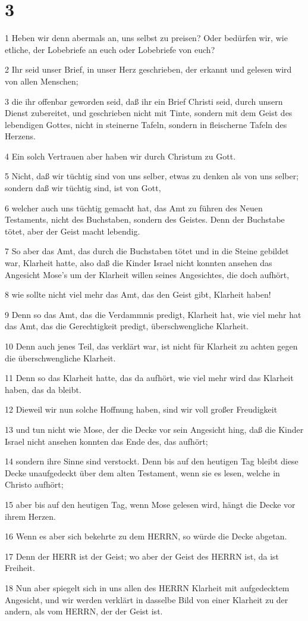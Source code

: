 \chapter{3}

\par 1 Heben wir denn abermals an, uns selbst zu preisen? Oder bedürfen wir, wie etliche, der Lobebriefe an euch oder Lobebriefe von euch?
\par 2 Ihr seid unser Brief, in unser Herz geschrieben, der erkannt und gelesen wird von allen Menschen;
\par 3 die ihr offenbar geworden seid, daß ihr ein Brief Christi seid, durch unsern Dienst zubereitet, und geschrieben nicht mit Tinte, sondern mit dem Geist des lebendigen Gottes, nicht in steinerne Tafeln, sondern in fleischerne Tafeln des Herzens.
\par 4 Ein solch Vertrauen aber haben wir durch Christum zu Gott.
\par 5 Nicht, daß wir tüchtig sind von uns selber, etwas zu denken als von uns selber; sondern daß wir tüchtig sind, ist von Gott,
\par 6 welcher auch uns tüchtig gemacht hat, das Amt zu führen des Neuen Testaments, nicht des Buchstaben, sondern des Geistes. Denn der Buchstabe tötet, aber der Geist macht lebendig.
\par 7 So aber das Amt, das durch die Buchstaben tötet und in die Steine gebildet war, Klarheit hatte, also daß die Kinder Israel nicht konnten ansehen das Angesicht Mose's um der Klarheit willen seines Angesichtes, die doch aufhört,
\par 8 wie sollte nicht viel mehr das Amt, das den Geist gibt, Klarheit haben!
\par 9 Denn so das Amt, das die Verdammnis predigt, Klarheit hat, wie viel mehr hat das Amt, das die Gerechtigkeit predigt, überschwengliche Klarheit.
\par 10 Denn auch jenes Teil, das verklärt war, ist nicht für Klarheit zu achten gegen die überschwengliche Klarheit.
\par 11 Denn so das Klarheit hatte, das da aufhört, wie viel mehr wird das Klarheit haben, das da bleibt.
\par 12 Dieweil wir nun solche Hoffnung haben, sind wir voll großer Freudigkeit
\par 13 und tun nicht wie Mose, der die Decke vor sein Angesicht hing, daß die Kinder Israel nicht ansehen konnten das Ende des, das aufhört;
\par 14 sondern ihre Sinne sind verstockt. Denn bis auf den heutigen Tag bleibt diese Decke unaufgedeckt über dem alten Testament, wenn sie es lesen, welche in Christo aufhört;
\par 15 aber bis auf den heutigen Tag, wenn Mose gelesen wird, hängt die Decke vor ihrem Herzen.
\par 16 Wenn es aber sich bekehrte zu dem HERRN, so würde die Decke abgetan.
\par 17 Denn der HERR ist der Geist; wo aber der Geist des HERRN ist, da ist Freiheit.
\par 18 Nun aber spiegelt sich in uns allen des HERRN Klarheit mit aufgedecktem Angesicht, und wir werden verklärt in dasselbe Bild von einer Klarheit zu der andern, als vom HERRN, der der Geist ist.


